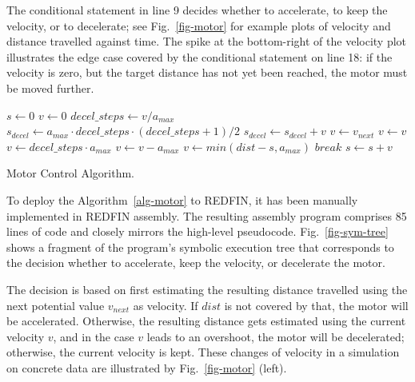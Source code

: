 The conditional statement in line 9 decides whether
to accelerate, to keep the velocity, or to decelerate;
see Fig.~\ref{fig-motor} for example plots of velocity and distance travelled
against time. The spike at the bottom-right of the velocity plot illustrates
the edge case covered by the conditional statement on line 18: if the velocity
is zero, but the target distance has not yet been reached, the motor must be
moved further.

\begin{algorithm}[h]
  \begin{algorithmic}[1]
\State $s \gets 0$
\State $v \gets 0$
  \State $decel\_steps\gets v / a_{max}$
  \State $s_{decel} \gets a_{max} \cdot decel\_steps \cdot (decel\_steps + 1) / 2$
    \State $s_{decel} \gets s_{decel} + v$
  \EndIf
    \State $v \gets v_{next}$ 
    \State $ v \gets v $     
  \Else
      \State $v \gets decel\_steps \cdot a_{max}$
    \Else
      \State $v \gets v - a_{max}$
      \EndIf
  \EndIf
      
      \State $v \gets min(dist - s, a_{max})$
    \Else
      \State $break$  
      \EndIf
      \EndIf
  \State $s \gets s + v$
\EndWhile
\end{algorithmic}
\caption{Motor Control Algorithm.\label{alg-motor}}
\end{algorithm}

To deploy the Algorithm~\ref{alg-motor} to REDFIN, it has been manually
implemented in REDFIN assembly. The resulting assembly program comprises 85 lines of
code and closely mirrors the high-level pseudocode. Fig.~\ref{fig-sym-tree} shows
a fragment of the program's symbolic execution tree that corresponds to the
decision whether to accelerate, keep the velocity, or decelerate the motor.

The decision is based on first estimating the resulting distance travelled using
the next potential value $v_{next}$ as velocity. If $dist$ is not covered by that,
the motor will be accelerated. Otherwise, the resulting distance gets estimated
using the current velocity $v$, and in the case $v$ leads to an overshoot, the
motor will be decelerated; otherwise, the current velocity is kept. These
changes of velocity in a simulation on concrete data are illustrated by
Fig.~\ref{fig-motor} (left).

